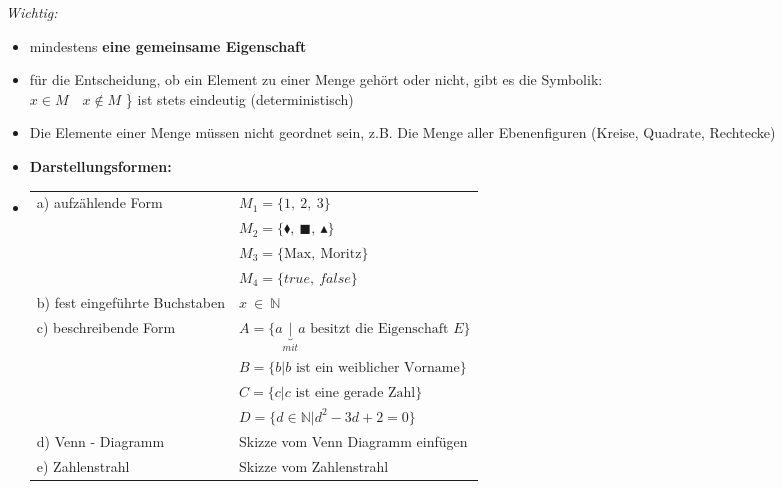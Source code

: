                 \textit{Wichtig:}
                    \begin{itemize}[leftmargin=*]
                        \item mindestens \bfseries eine \mdseries gemeinsame Eigenschaft
                        \item für die Entscheidung, ob ein Element zu einer Menge gehört oder nicht, gibt es die Symbolik: \\
                            $x \in M \quad x \notin M $ \} ist stets eindeutig (deterministisch)
                        \item {} Die Elemente einer Menge müssen nicht geordnet sein, z.B. Die Menge aller Ebenenfiguren (Kreise, Quadrate, Rechtecke)
                        \item \textbf{Darstellungsformen:}
                        \item[] \begin{tabular}{@{}l p{9cm}}
                            a) aufzählende Form             & $M_1 = \{1, \ 2, \ 3\} $  \\
                                                            & $M_2 = \{\blacklozenge, \ \blacksquare, \ \blacktriangle \} $  \\
                                                            & $M_3 = \{\text{Max}, \ \text{Moritz}\} $ \\
                                                            & $M_4 = \{true, \ false\} $ \\
                            b) fest eingeführte Buchstaben  &  $ x \ \in \ \mathbb{N}$\\ 
                            c) beschreibende Form           & $A = \{a \underbrace{|}_{mit} a \text{~besitzt die Eigenschaft~} E\}$\\
                                                            & $B = \{b | b \text{~ist ein weiblicher Vorname} \} $ \\
                                                            & $C = \{c | c \text{~ist eine gerade Zahl} \} $ \\
                                                            & $D = \{d \in \mathbb{N} | d^2 - 3d + 2 = 0 \} $\\
                            d) Venn - Diagramm              & Skizze vom Venn Diagramm einfügen \\
                            e) Zahlenstrahl                 & Skizze vom Zahlenstrahl \\

\end{tabular}
\end{itemize}
